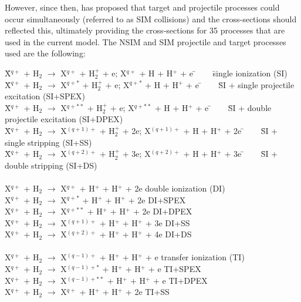 \documentclass[draft]{agujournal2018}
\begin{document}
However, since then, \citet{schultz2019} has proposed that target and projectile processes could occur simultaneously (referred to as SIM collisions) and the cross-sections should reflected this, ultimately providing the cross-sections for 35 processes that are used in the current model.
The NSIM and SIM projectile and target processes used are the following:

\begin{tabbing}
\= X$^{q+}$ + H$_2$ $\rightarrow$ X$^{q+}$ + H$_2^+$ + e;  X$^{q+}$ + H + H$^+$ + e \= $\;\;\;\;\;$ \= single ionization (SI) \\
\= X$^{q+}$ + H$_2$ $\rightarrow$ X$^{q+*}$ + H$_2^+$ + e;  X$^{q+*}$ + H + H$^+$ + e \= $\;\;\;\;\;$ \= SI + single projectile excitation (SI+SPEX) \\
\= X$^{q+}$ + H$_2$ $\rightarrow$ X$^{q+**}$ + H$_2^+$ + e;  X$^{q+**}$ + H + H$^+$ + e \= $\;\;\;\;\;$ \= SI + double projectile excitation (SI+DPEX) \\
\= X$^{q+}$ + H$_2$ $\rightarrow$ X$^{(q+1)+}$ + H$_2^+$ + 2e;  X$^{(q+1)+}$ + H + H$^+$ + 2e \= $\;\;\;\;\;$ \= SI + single stripping (SI+SS)\\
\= X$^{q+}$ + H$_2$ $\rightarrow$ X$^{(q+2)+}$ + H$_2^+$ + 3e;  X$^{(q+2)+}$ + H + H$^+$ + 3e \= $\;\;\;\;\;$ \= SI + double stripping (SI+DS) \\
\\
\> X$^{q+}$ + H$_2$ $\rightarrow$ X$^{q+}$ + H$^+$ + H$^+$ + 2e	 \>  \> double ionization (DI) \\
\> X$^{q+}$ + H$_2$ $\rightarrow$ X$^{q+*}$ + H$^+$ + H$^+$ + 2e \>  \> DI+SPEX \\
\> X$^{q+}$ + H$_2$ $\rightarrow$ X$^{q+**}$ + H$^+$ + H$^+$ + 2e \>  \> DI+DPEX \\
\> X$^{q+}$ + H$_2$ $\rightarrow$ X$^{(q+1)+}$ + H$^+$ + H$^+$ + 3e \>  \> DI+SS \\
\> X$^{q+}$ + H$_2$ $\rightarrow$ X$^{(q+2)+}$ + H$^+$ + H$^+$ + 4e	 \>  \> DI+DS \\
\\
\> X$^{q+}$ + H$_2$ $\rightarrow$ X$^{(q-1)+}$ + H$^+$ + H$^+$ + e  \>  \> transfer ionization (TI) \\
\> X$^{q+}$ + H$_2$ $\rightarrow$ X$^{(q-1)+*}$ + H$^+$ + H$^+$ + e  \>  \> TI+SPEX \\
\> X$^{q+}$ + H$_2$ $\rightarrow$ X$^{(q-1)+**}$ + H$^+$ + H$^+$ + e  \>  \> TI+DPEX \\
\> X$^{q+}$ + H$_2$ $\rightarrow$ X$^{q+}$ + H$^+$ + H$^+$ + 2e  \>  \> TI+SS \\

\end{tabbing}
\end{document}
